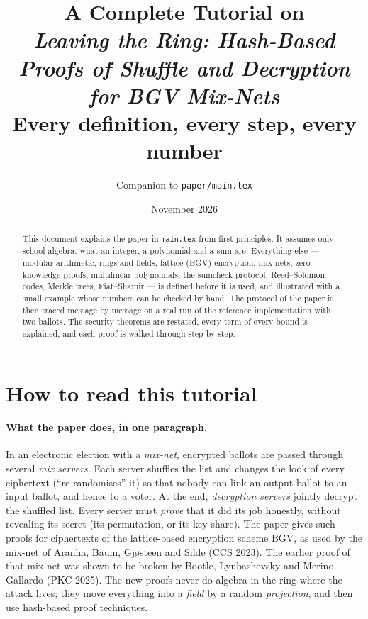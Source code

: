 \documentclass[11pt,a4paper]{article}
\title{A Complete Tutorial on\\[0.3em]
\emph{Leaving the Ring: Hash-Based Proofs of Shuffle and Decryption for BGV Mix-Nets}\\[0.4em]
\large Every definition, every step, every number}
\author{Companion to \texttt{paper/main.tex}}
\date{November 2026}
\theoremstyle{definition}
\theoremstyle{plain}
\begin{document}
\maketitle

\begin{abstract}
This document explains the paper in \texttt{main.tex} from first principles. It assumes only
school algebra: what an integer, a polynomial and a sum are. Everything else --- modular
arithmetic, rings and fields, lattice (BGV) encryption, mix-nets, zero-knowledge proofs,
multilinear polynomials, the sumcheck protocol, Reed--Solomon codes, Merkle trees, Fiat--Shamir
--- is defined before it is used, and illustrated with a small example whose numbers can be
checked by hand. The protocol of the paper is then traced message by message on a real run of
the reference implementation with two ballots. The security theorems are restated, every term of
every bound is explained, and each proof is walked through step by step.
\end{abstract}

\tableofcontents
\newpage

\section{How to read this tutorial}

\paragraph{What the paper does, in one paragraph.}
In an electronic election with a \emph{mix-net}, encrypted ballots are passed through several
\emph{mix servers}. Each server shuffles the list and changes the look of every ciphertext
(``re-randomises'' it) so that nobody can link an output ballot to an input ballot, and hence to a
voter. At the end, \emph{decryption servers} jointly decrypt the shuffled list. Every server must
\emph{prove} that it did its job honestly, without revealing its secret (its permutation, or its key
share). The paper gives such proofs for ciphertexts of the lattice-based encryption scheme BGV, as
used by the mix-net of Aranha, Baum, Gj{\o}steen and Silde (CCS 2023). The earlier proof of that
mix-net was shown to be broken by Bootle, Lyubashevsky and Merino-Gallardo (PKC 2025). The new
proofs never do algebra in the ring where the attack lives; they move everything into a
\emph{field} by a random \emph{projection}, and then use hash-based proof techniques.
\end{document}
